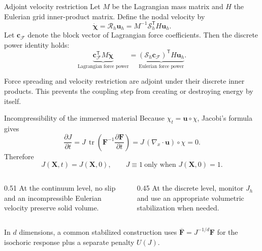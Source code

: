 \documentclass[aspectratio=169,11pt]{beamer}
\newcommand{\Xvec}{\bm{X}}
\newcommand{\uvec}{\bm{u}}
\newcommand{\Ften}{\bm{F}}
\newcommand{\Fcoef}{\bm{c}_{\!\mathcal F}}
\newcommand{\divx}{\nabla_{\!x}\!\cdot}
\begin{document}
\begin{frame}{Adjoint velocity restriction}
Let \(M\) be the Lagrangian mass matrix and \(H\) the Eulerian grid inner-product matrix. Define the nodal velocity by
\[
  \boxed{
  \dot{\bm{\chi}}
  =
  \mathcal{R}_h\uvec_h
  =
  M^{-1}\mathcal{S}_h^{\mathsf T}H\uvec_h
  }.
\]
Let \(\Fcoef\) denote the block vector of Lagrangian force coefficients. Then the discrete power identity holds:
\[
  \underbrace{\Fcoef^{\mathsf T}M\dot{\bm{\chi}}}_{\text{Lagrangian force power}}
  =
  \underbrace{(\mathcal{S}_h\Fcoef)^{\mathsf T}H\uvec_h}_{\text{Eulerian force power}} .
\]
\begin{punchbox}
\small Force spreading and velocity restriction are adjoint under their discrete inner products. This prevents the coupling step from creating or destroying energy by itself.
\end{punchbox}
\end{frame}

\begin{frame}{Incompressibility of the immersed material}
Because \(\chi_t=\uvec\circ\chi\), Jacobi's formula gives
\[
  \frac{\partial J}{\partial t}
  =
  J\,\operatorname{tr}
  \!\left(\Ften^{-1}\frac{\partial\Ften}{\partial t}\right)
  =
  J\,(\divx\uvec)\circ\chi
  =0.
\]
Therefore
\[
  J(\Xvec,t)=J(\Xvec,0),
  \qquad
  J\equiv1\ \text{only when }J(\Xvec,0)=1.
\]
\begin{columns}[T,onlytextwidth]
\begin{column}{0.51\textwidth}
At the continuum level, no slip and an incompressible Eulerian velocity preserve solid volume.
\end{column}
\begin{column}{0.45\textwidth}
At the discrete level, monitor \(J_h\) and use an appropriate volumetric stabilization when needed.
\end{column}
\end{columns}
\medskip
\begin{punchbox}
\small In \(d\) dimensions, a common stabilized construction uses \(\overline{\Ften}=J^{-1/d}\Ften\) for the isochoric response plus a separate penalty \(U(J)\).
\end{punchbox}
\end{frame}
\end{document}
